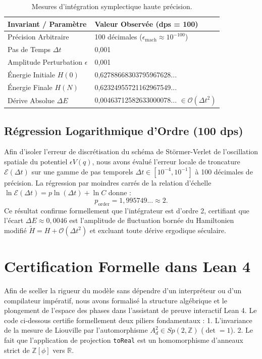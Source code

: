 \documentclass[10pt,twocolumn,a4paper]{article}
\theoremstyle{plain}
\theoremstyle{definition}
\begin{document}
\begin{table}[h]
\centering
\scriptsize
\begin{tabular}{ll}
\toprule
\textbf{Invariant / Paramètre} & \textbf{Valeur Observée (dps = 100)} \\
\midrule
Précision Arbitraire & 100 décimales ($\epsilon_{\text{mach}} \approx 10^{-100}$) \\
Pas de Temps $\Delta t$ & 0,001 \\
Amplitude Perturbation $\epsilon$ & 0,001 \\
Énergie Initiale $H(0)$ & 0,62788668303795967628... \\
Énergie Finale $H(N)$ & 0,62324955721162967549... \\
Dérive Absolue $\Delta E$ & 0,00463712582633000078... $\in \mathcal{O}(\Delta t^2)$ \\
\bottomrule
\end{tabular}
\caption{Mesures d'intégration symplectique haute précision.}
\label{tab:mesures}
\end{table}

\subsection{Régression Logarithmique d'Ordre (100 dps)}
Afin d'isoler l'erreur de discrétisation du schéma de Störmer-Verlet de l'oscillation spatiale du potentiel $\epsilon V(q)$, nous avons évalué l'erreur locale de troncature $\mathcal{E}(\Delta t)$ sur une gamme de pas temporels $\Delta t \in [10^{-4}, 10^{-1}]$ à 100 décimales de précision.
La régression par moindres carrés de la relation d'échelle $\ln \mathcal{E}(\Delta t) = p \ln(\Delta t) + \ln C$ donne :
\begin{equation}
p_{\text{order}} = 1{,}995749... \approx 2.
\label{eq:ordre_numerique}
\end{equation}
Ce résultat confirme formellement que l'intégrateur est d'ordre 2, certifiant que l'écart $\Delta E \approx 0{,}0046$ est l'amplitude de fluctuation bornée du Hamiltonien modifié $\widetilde{H} = H + \mathcal{O}(\Delta t^2)$ et excluant toute dérive ergodique séculaire.

\section{Certification Formelle dans Lean 4}
Afin de sceller la rigueur du modèle sans dépendre d'un interpréteur ou d'un compilateur impératif, nous avons formalisé la structure algébrique et le plongement de l'espace des phases dans l'assistant de preuve interactif Lean 4.
Le code ci-dessous certifie formellement deux piliers fondamentaux : 1. L'invariance de la mesure de Liouville par l'automorphisme $A_d^2 \in Sp(2, \mathbb{Z})$ ($\det = 1$). 2. Le fait que l'application de projection \texttt{toReal} est un homomorphisme d'anneaux strict de $\mathbb{Z}[\phi]$ vers $\mathbb{R}$.
\end{document}
